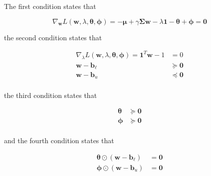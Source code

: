 \documentclass{beamer}
\begin{document}
\begin{frame}

\justifying
The first condition states that

\justifying
\begin{equation*}
	\nabla_{\mathbf{w}} L\left(\mathbf{w},\lambda,\boldsymbol\theta,\boldsymbol\phi\right) = -\boldsymbol\mu + \gamma\mathbf{\Sigma}\mathbf{w} - \lambda \mathbf{1} - \boldsymbol\theta + \boldsymbol\phi = \mathbf{0}
\end{equation*}

\vspace{0.2cm}
\justifying
the second condition states that

\justifying
\begin{equation*}
\begin{aligned}
	\nabla_{\lambda} L\left(\mathbf{w},\lambda,\boldsymbol\theta,\boldsymbol\phi\right) = \mathbf{1}^{T}\mathbf{w} - 1 & = 0\\
	\mathbf{w} - \mathbf{b}_{\ell} & \succcurlyeq \mathbf{0}\\
	\mathbf{w} - \mathbf{b}_{u} & \preccurlyeq \mathbf{0}\\
\end{aligned}
\end{equation*}

\justifying
the third condition states that

\justifying
\begin{equation*}
\begin{aligned}
	\boldsymbol\theta & \succcurlyeq \mathbf{0} \\
	\boldsymbol\phi & \succcurlyeq \mathbf{0}\\
\end{aligned}
\end{equation*}

\vspace{0.2cm}
\justifying
and the fourth condition states that

\justifying
\begin{equation*}
\begin{aligned}
	\boldsymbol\theta \odot \left( \mathbf{w}-\mathbf{b}_{\ell} \right) & = \mathbf{0} \\
	\boldsymbol\phi \odot \left( \mathbf{w}-\mathbf{b}_{u} \right) & = \mathbf{0} \\
\end{aligned}
\end{equation*}

\end{frame}
\end{document}
